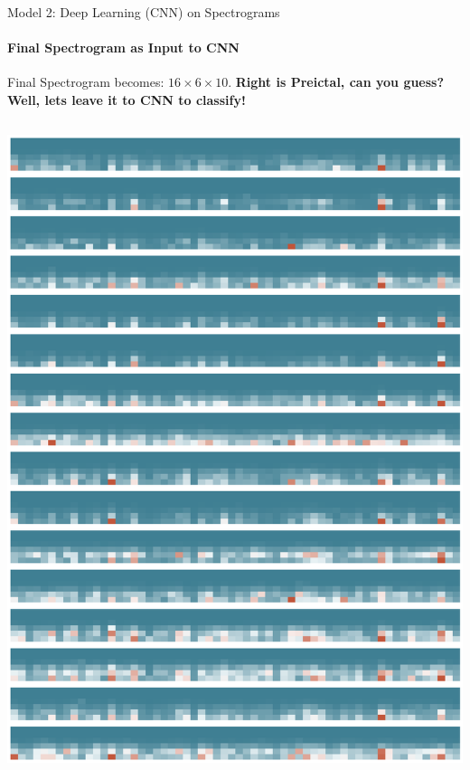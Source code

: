 \documentclass{beamer}
\begin{document}
\begin{frame}{Model 2: Deep Learning (CNN) on Spectrograms}
  \framesubtitle{Final Spectrogram as Input to CNN}

  Final Spectrogram becomes: $16 \times 6 \times 10$. \textbf{Right is Preictal,
    can you guess? Well, lets leave it to CNN to classify!}

  \begin{columns}
    \includegraphics[scale=0.22]{img/sample_spec.eps}
    


\end{columns}
\end{frame}
\end{document}
